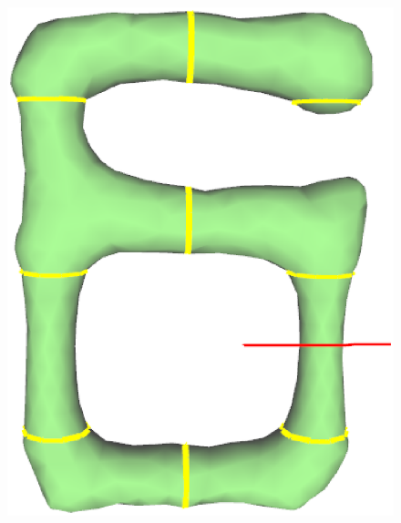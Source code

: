 \begin{figure} [htbp]
{\begin{minipage}[b]{0.22\textwidth}
      \includegraphics[scale=0.13]{figs/f6.BEsplit-split2.eps}
    \end{minipage}}
\end{figure}
